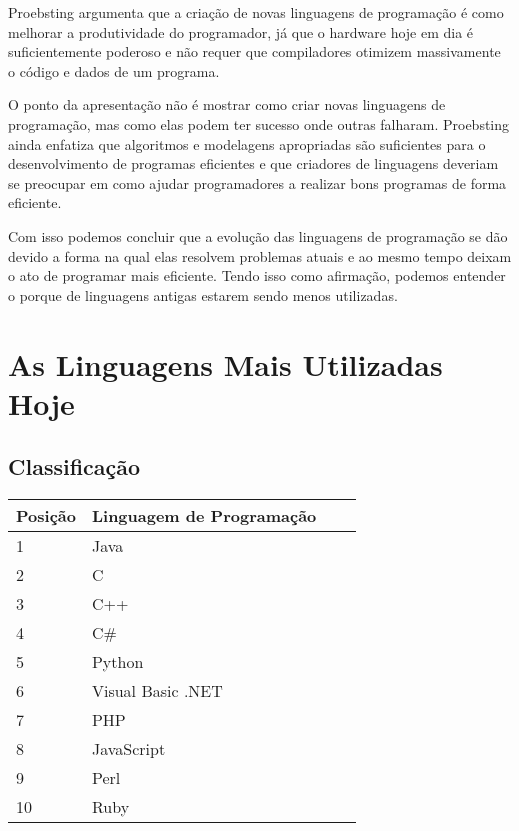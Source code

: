 \documentclass[
    12pt,               %
    openright,          %
    twoside,            %
    a4paper,            %
    brazil              %
    ]{abntex2}
\begin{document}
Proebsting argumenta que a criação de novas linguagens de programação é como
melhorar a produtividade do programador, já que o hardware hoje em dia é
suficientemente poderoso e não requer que compiladores otimizem massivamente o
código e dados de um programa.

O ponto da apresentação não é mostrar como criar novas linguagens de
programação, mas como elas podem ter sucesso onde outras falharam.  Proebsting
ainda enfatiza que algoritmos e modelagens apropriadas são suficientes para o
desenvolvimento de programas eficientes e que criadores de linguagens deveriam
se preocupar em como ajudar programadores a realizar bons programas de forma
eficiente.

Com isso podemos concluir que a evolução das linguagens de programação se dão
devido a forma na qual elas resolvem problemas atuais e ao mesmo tempo deixam o
ato de programar mais eficiente. Tendo isso como afirmação, podemos entender o
porque de linguagens antigas estarem sendo menos utilizadas.

\chapter{As Linguagens Mais Utilizadas Hoje}

\section{Classificação}

\begin{center}
\begin{tabular}{ | l | l | l | p{5cm} |}
\hline
Posição & Linguagem de Programação \\ \hline
1 & Java \\ \hline
2 & C \\ \hline
3 & C++ \\ \hline
4 & C\# \\ \hline
5 & Python \\ \hline
6 & Visual Basic .NET \\ \hline
7 & PHP \\ \hline
8 & JavaScript \\ \hline
9 & Perl \\ \hline
10 & Ruby \\ \hline
\end{tabular}
\end{center}
\end{document}
